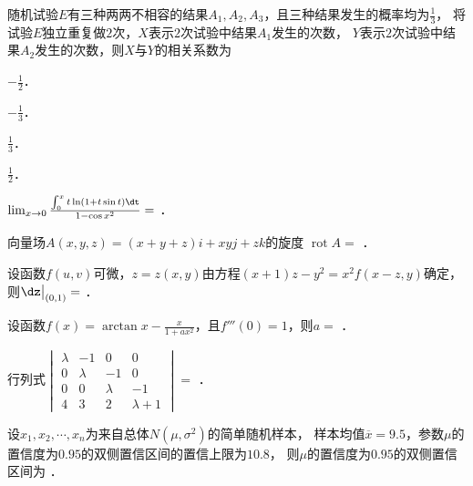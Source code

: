 \documentclass[plain,noanswer,medmath]{../../template/jnuexam}
\begin{document}
\begin{problem}
随机试验$E$有三种两两不相容的结果$A_1,A_2,A_3$，且三种结果发生的概率均为$\frac{1}{3}$，
将试验$E$独立重复做$2$次，$X$表示$2$次试验中结果$A_1$发生的次数，
$Y$表示$2$次试验中结果$A_2$发生的次数，则$X$与$Y$的相关系数为\pickout{}
\begin{abcd}
\item $- \frac{1}{2}$．
\item $- \frac{1}{3}$．
\item $\frac{1}{3}$．
\item $\frac{1}{2}$．
\end{abcd}
\end{problem}




\begin{problem}
$\lim_{x \to 0} \frac{\int_0^x t\ln \left(1 + t\sin t \right)\dt}{1 - \cos x^2} =$ \fillin{}．
\end{problem}


\begin{problem}
向量场$A\left(x,y,z \right) = \left(x + y + z \right)i + xyj + zk$的旋度
$\operatorname{rot} A =$ \fillin{}．
\end{problem}


\begin{problem}
设函数$f(u,v)$可微，$z = z(x,y)$由方程$(x + 1)z - y^2 = x^2 f(x - z,y)$确定，
则$\dz\big|_{(0,1)}=$ \fillin{}．
\end{problem}


\begin{problem}
设函数$f(x) = \arctan x - \frac{x}{1 + ax^2}$，且$f'''(0) = 1$，则$a =$ \fillin{}．
\end{problem}


\begin{problem}
行列式$\begin{vmatrix}
  \lambda &      -1 &       0 & 0 \\
        0 & \lambda &      -1 & 0 \\
        0 &       0 & \lambda & -1 \\
        4 &       3 &       2 & \lambda + 1
\end{vmatrix} =$ \fillin{}．
\end{problem}


\begin{problem}
设$x_1,x_2, \cdots ,x_n$为来自总体$N\left(\mu ,\sigma^2 \right)$的简单随机样本，
样本均值$\overline{x} = 9.5$，参数$\mu$的置信度为$0.95$的双侧置信区间的置信上限为$10.8$，
则$\mu$的置信度为$0.95$的双侧置信区间为 \fillin{}．
\end{problem}
\end{document}

